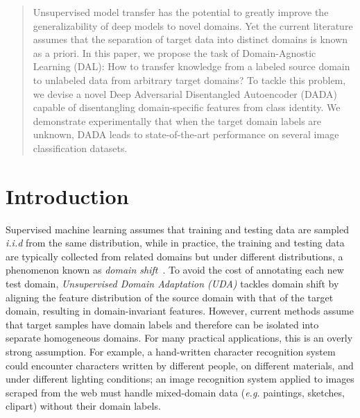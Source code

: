 \documentclass{article}
\begin{document}

\printAffiliationsAndNotice{}  

\begin{abstract}
Unsupervised model transfer  has the potential to greatly improve the generalizability of deep models to novel domains. Yet the current literature assumes that the separation of target data into distinct domains is known as a priori. In this paper, we propose the task of Domain-Agnostic Learning (DAL): How to  transfer knowledge from a labeled source domain to unlabeled data from arbitrary target domains? To tackle this problem, we devise a novel Deep Adversarial Disentangled Autoencoder (DADA) capable of disentangling domain-specific features from class identity. We demonstrate experimentally that when the target domain labels are unknown, DADA leads to state-of-the-art performance on several image classification datasets.
\end{abstract}

\section{Introduction}
\label{sec_intro}

Supervised machine learning assumes that training and testing data are sampled \textit{i.i.d} from the same distribution, while in practice, the training and testing data are typically collected from related domains but under different distributions, a phenomenon known as \textit{domain shift}~\cite{datashift_book2009}. To avoid the cost of annotating each new test domain, \textit{Unsupervised Domain Adaptation (UDA)} tackles domain shift by aligning the feature distribution of the source domain with that of the target domain, resulting in domain-invariant features. 
However, current methods assume that target samples have domain labels and therefore can be isolated into separate homogeneous domains. For many practical applications, this is an overly strong assumption. For example, a hand-written character recognition system could encounter characters written by different people, on different materials, and under different lighting conditions; an image recognition system applied to images scraped from the web must handle mixed-domain data (\textit{e.g.} paintings, sketches, clipart) without 
their domain labels.
\end{document}
